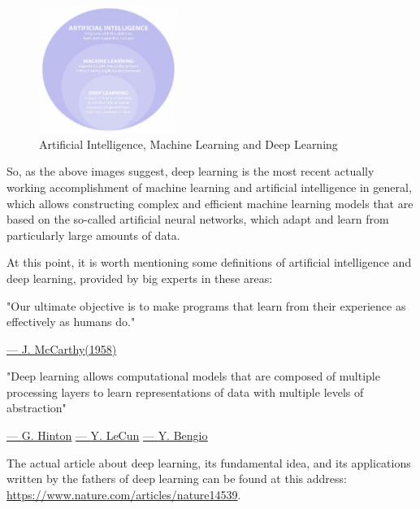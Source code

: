 \vspace{3mm}

\begin{figure}[h]
    \centering
    \includegraphics[width=0.4\textwidth]{../img/AI_ML_DL_2}
    \caption{Artificial Intelligence, Machine Learning and Deep Learning}
\end{figure}

\newpage

So, as the above images suggest, deep learning is the most recent
actually working accomplishment of machine learning and artificial
intelligence in general, which allows constructing complex and efficient
machine learning models that are based on the so-called artificial
neural networks, which adapt and learn from particularly large amounts
of data.

At this point, it is worth mentioning some definitions of artificial
intelligence and deep learning, provided by big experts in these areas:

\vspace{5mm}

\begin{quoting}
    "Our ultimate objective is to make programs that learn from their
    experience as effectively as humans do."
\end{quoting}

\hspace{306pt}
\href{https://en.wikipedia.org/wiki/John_McCarthy_(computer_scientist)}{--- \underline{J. McCarthy(1958)}}

\vspace{5mm}

\begin{quoting}
    "Deep learning allows computational models that are composed of
    multiple processing layers to learn representations of data with
    multiple levels of abstraction"
\end{quoting}

\hspace{210pt}
\href{https://en.wikipedia.org/wiki/Geoffrey_Hinton}{--- \underline{G. Hinton}}
\href{https://en.wikipedia.org/wiki/Yann_LeCun}{--- \underline{Y. LeCun}}
\href{https://en.wikipedia.org/wiki/Yoshua_Bengio}{--- \underline{Y. Bengio}}

\vspace{10mm}

The actual article about deep learning, its fundamental idea, and its
applications written by the fathers of deep learning can be found at
this address:
\url{https://www.nature.com/articles/nature14539}.